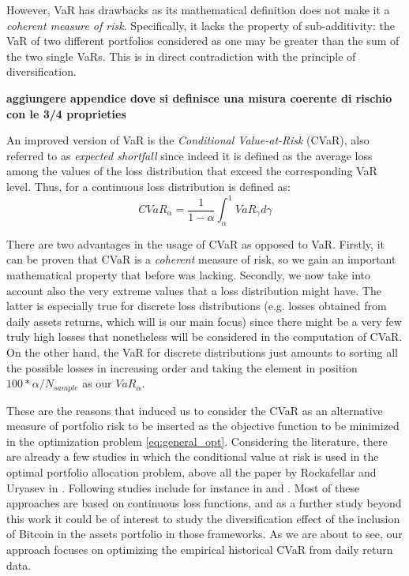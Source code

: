However, VaR has drawbacks as its mathematical definition does not make it a \textit{coherent measure of risk}. Specifically, it lacks the property of sub-additivity: the VaR of two different portfolios  considered as one may be greater than the sum of the two single VaRs. This is in direct contradiction with the principle of diversification.

\textbf{aggiungere appendice dove si definisce una misura coerente di rischio con le 3/4 proprieties}

An improved version of VaR is the \textit{Conditional Value-at-Risk} (CVaR), also referred to as \textit{expected shortfall} since indeed it is defined as the average loss among the values of the loss distribution that exceed the corresponding VaR level. Thus, for a continuous loss distribution is defined as:
\begin{equation}
	CVaR_\alpha = \frac{1}{1-\alpha} \int_{\alpha}^{1} VaR_\gamma d\gamma 
\end{equation}

There are two advantages in the usage of CVaR as opposed to VaR. Firstly, it can be proven that CVaR is a \textit{coherent} measure of risk, so we gain an important mathematical property that before was lacking. Secondly, we now take into account also the very extreme values that a loss distribution might have. The latter is especially true for discrete loss distributions (e.g. losses obtained from daily assets returns, which will is our main focus) since there might be a very few  truly high losses that nonetheless will be considered in the computation of CVaR. On the other hand, the VaR for discrete distributions just amounts to sorting all the possible losses in increasing order and taking the element in position $100*\alpha / N_{sample}$ as our $VaR_\alpha$. 

These are the reasons that induced us to consider the CVaR as an alternative measure of portfolio risk to be inserted as the objective function to be minimized in the optimization problem \eqref{eq:general_opt}. 
Considering the literature, there are already a few studies in which the conditional value at risk is used in the optimal portfolio allocation problem,  above all the paper by Rockafellar and Uryasev in \citep{ROCKAFELLAR2000}. Following studies include for instance in \citep{DICLEMENTE2002} and \citep{QUARANTA2008}. 
Most of these approaches are based on continuous loss functions, and as a further study beyond this work it could be of interest to study the diversification effect of the inclusion of Bitcoin in the assets portfolio in those frameworks. As we are about to see, our approach  focuses on optimizing the empirical historical CVaR from daily return data.




